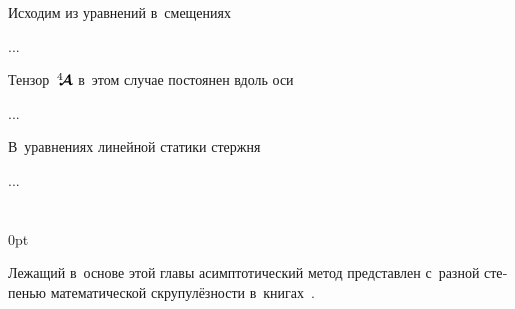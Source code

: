\begin{otherlanguage}{russian}

Исходим из уравнений в~смещениях

...



\end{otherlanguage}



\begin{otherlanguage}{russian}

Тензор~${\hspace{.08ex}{^4\hspace{-0.7ex}\bm{\mathcal{A}}}\hspace{.08ex}}$ в~этом случае постоянен вдоль оси

...



\end{otherlanguage}



\begin{otherlanguage}{russian}

В~уравнениях линейной статики стержня


...



\end{otherlanguage}

\section*{\small \wordforbibliography}

\begin{changemargin}{\parindent}{0pt}
\fontsize{10}{12}\selectfont

\begin{otherlanguage}{russian}

Лежащий в~основе этой главы
асимптотический метод
представлен
с~разной степенью математической скрупулёзности
в~книгах~\cite{bakhvalov.panasenko, asymptoticanalysisforperiodicstructures, kravchuk.mayboroda.urzhumtsev-polymericandcompositematerials, pobedrya-composites}.

\end{otherlanguage}

\end{changemargin}

